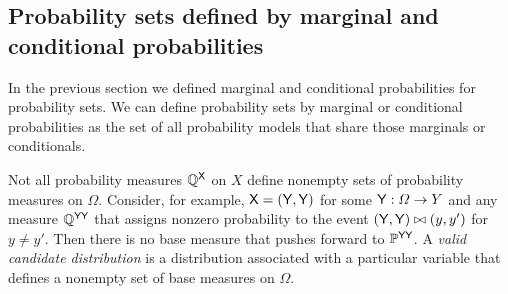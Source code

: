



\subsection{Probability sets defined by marginal and conditional probabilities}

In the previous section we defined marginal and conditional probabilities for probability sets. We can define probability sets by marginal or conditional probabilities as the set of all probability models that share those marginals or conditionals.

Not all probability measures $\mathbb{Q}^{\mathsf{X}}$ on $X$ define nonempty sets of probability measures on $\Omega$. Consider, for example, $\mathsf{X}=(\mathsf{Y},\mathsf{Y})$ for some $\mathsf{Y}:\Omega\to Y$ and any measure $\mathbb{Q}^{\mathsf{YY}}$ that assigns nonzero probability to the event $(\mathsf{Y},\mathsf{Y})\bowtie (y,y')$ for $y\neq y'$. Then there is no base measure that pushes forward to $\mathbb{P}^{\mathsf{YY}}$. A \emph{valid candidate distribution} is a distribution associated with a particular variable that defines a nonempty set of base measures on $\Omega$.

